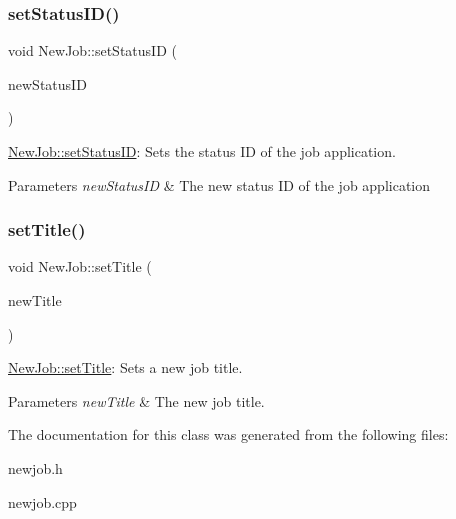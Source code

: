 \subsubsection{\texorpdfstring{set\+Status\+I\+D()}{setStatusID()}}
{\footnotesize\ttfamily void New\+Job\+::set\+Status\+ID (\begin{DoxyParamCaption}\item[{int}]{new\+Status\+ID }\end{DoxyParamCaption})}



\mbox{\hyperlink{class_new_job_aa184d2046d0e60e82cd5840c40b99bed}{New\+Job\+::set\+Status\+ID}}\+: Sets the status ID of the job application. 


\begin{DoxyParams}{Parameters}
{\em new\+Status\+ID} & The new status ID of the job application \\
\hline
\end{DoxyParams}
\mbox{\label{class_new_job_ae8c2b576f2ea6f444776e6d944f0d767}} 
\subsubsection{\texorpdfstring{set\+Title()}{setTitle()}}
{\footnotesize\ttfamily void New\+Job\+::set\+Title (\begin{DoxyParamCaption}\item[{Q\+String}]{new\+Title }\end{DoxyParamCaption})}



\mbox{\hyperlink{class_new_job_ae8c2b576f2ea6f444776e6d944f0d767}{New\+Job\+::set\+Title}}\+: Sets a new job title. 


\begin{DoxyParams}{Parameters}
{\em new\+Title} & The new job title. \\
\hline
\end{DoxyParams}


The documentation for this class was generated from the following files\+:\begin{DoxyCompactItemize}
\item 
newjob.\+h\item 
newjob.\+cpp\end{DoxyCompactItemize}
